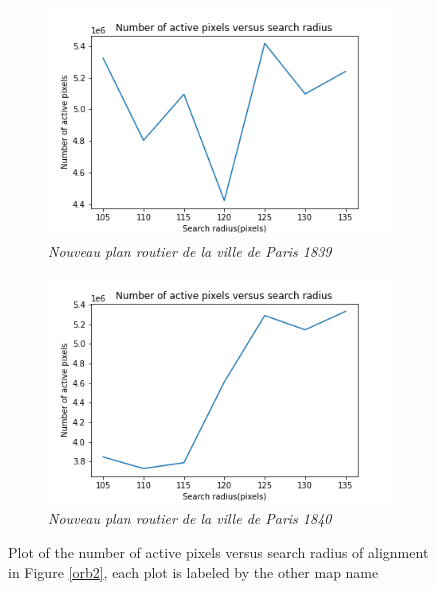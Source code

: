 \begin{figure}[h!]
     \centering
     \captionsetup{width=.9\textwidth, justification=centering}
     \begin{subfigure}{0.48\textwidth}
         \centering
         \includegraphics[width=\textwidth]{Images/Map other/similarity_versus_radius_map_7.png}
         \caption{\textit{Nouveau plan routier de la ville de Paris 1839}}
     \end{subfigure}
     \hfill
     \begin{subfigure}{0.48\textwidth}
         \centering
         \includegraphics[width=\textwidth]{Images/Map other/similarity_versus_radius_map_10.png}
         \caption{\textit{Nouveau plan routier de la ville de Paris 1840}}
     \end{subfigure}
        \caption{Plot of the number of active pixels versus search radius of alignment in Figure \ref{orb2}, each plot is labeled by the other map name}
        \label{search2}
\end{figure}

